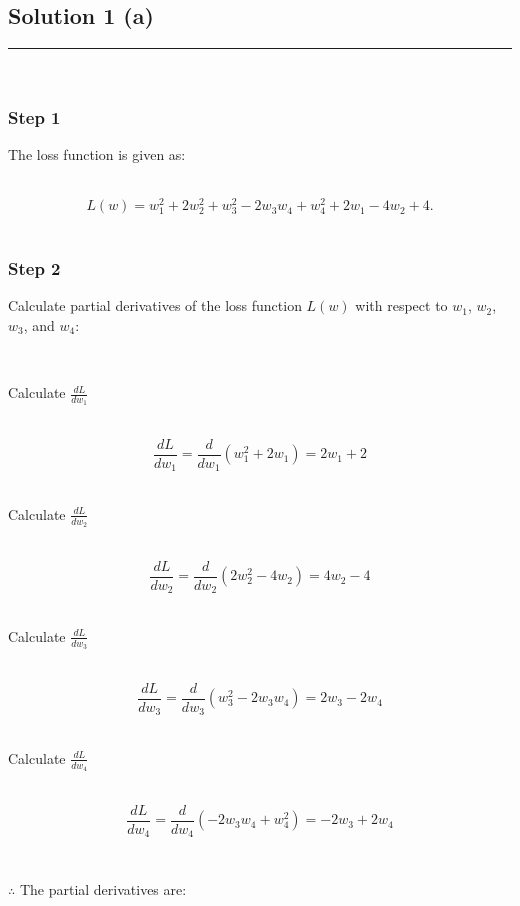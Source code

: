 \documentclass{article}
\begin{document}
\pagestyle{fancy}

\subsection*{Solution 1 (a)}
\noindent\rule{\textwidth}{0.4pt}\\

\subsubsection*{Step 1}
\parbox{\textwidth}{
The loss function is given as:
}\\

$$L(w)=w_{1}^{2}+2w_{2}^{2}+w_{3}^{2}-2w_{3}w_{4}+w_{4}^{2}+2w_{1}-4w_{2}+4.$$\\

\subsubsection*{Step 2}
\parbox{\textwidth}{
Calculate partial derivatives of the loss function $L(w)$ with respect to $w_1$, $w_2$, $w_3$, and $w_4$:
}\\


\parbox{\textwidth}{
Calculate $\frac{dL}{dw_1}$
}\\

$$\frac{dL}{dw_1} = \frac{d}{dw_1}(w_{1}^{2}+2w_{1}) = 2w_1 + 2$$\\

\parbox{\textwidth}{
Calculate $\frac{dL}{dw_2}$
}\\

$$\frac{dL}{dw_2} = \frac{d}{dw_2}(2w_{2}^{2}-4w_{2}) = 4w_2 - 4$$\\

\parbox{\textwidth}{
Calculate $\frac{dL}{dw_3}$
}\\

$$\frac{dL}{dw_3} = \frac{d}{dw_3}(w_{3}^{2}-2w_{3}w_{4}) = 2w_3 - 2w_4$$\\

\parbox{\textwidth}{
Calculate $\frac{dL}{dw_4}$
}\\

$$\frac{dL}{dw_4} = \frac{d}{dw_4}(-2w_{3}w_{4}+w_{4}^{2}) = -2w_3 + 2w_4$$\\

\subsubsection*{\normalfont}{$\therefore$ The partial derivatives are:}
\end{document}
